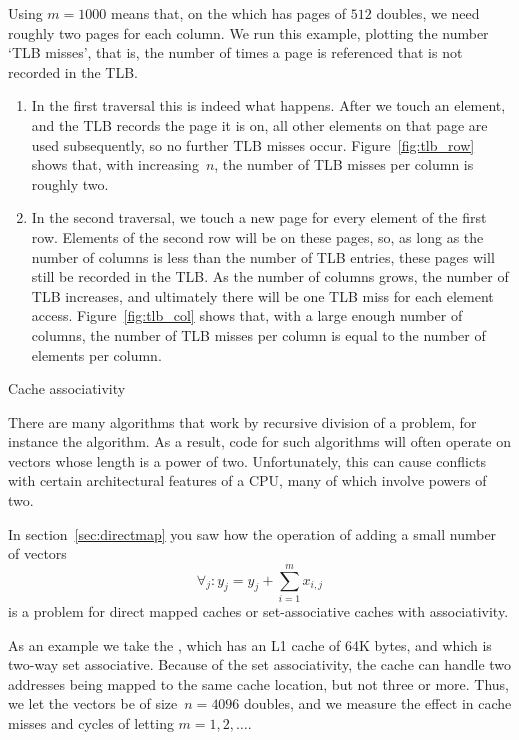 Using $m=1000$ means that, on the  which
has pages of $512$ doubles, we need roughly two pages for each
column. We run this example, plotting the number `TLB misses', that
is, the number of times a page is referenced that is not recorded in
the TLB.
\begin{enumerate}
\item In the first traversal this is indeed what happens. After we
  touch an element, and the TLB records the page it is on, all other
  elements on that page are used subsequently, so no further TLB
  misses occur. Figure~\ref{fig:tlb_row} shows that, with increasing~$n$,
  the number of TLB misses per column is roughly two.
\item In the second traversal, we touch a new page for every element
  of the first row. Elements of the second row will be on these pages,
  so, as long as the number of columns is less than the number of TLB
  entries, these pages will still be recorded in the TLB. As the
  number of columns grows, the number of TLB increases, and ultimately
  there will be one TLB miss for each element
  access. Figure~\ref{fig:tlb_col} shows that, with a large enough number
  of columns, the number of TLB misses per column is equal to the
  number of elements per column.
\end{enumerate}

 {Cache associativity}
\label{sec:assoc-coding}

There are many algorithms that work by recursive division of a
problem, for instance the  algorithm. As a result, code
for such algorithms will often operate on vectors whose length is a power of
two. Unfortunately, this can cause conflicts with certain
architectural features of a CPU, many of which involve powers of two.

In section~\ref{sec:directmap} you saw how
the operation of adding a small number of vectors
\[ \forall_j\colon y_j= y_j+\sum_{i=1}^mx_{i,j} \]
is a problem for direct mapped caches or set-associative caches with
associativity.

As an example we take the
, which has an L1 cache of 64K bytes, and
which is two-way set associative. Because of the set associativity,
the cache can handle two addresses being mapped to the same cache
location, but not three or more. Thus, we let the vectors be of
size~$n=4096$ doubles, and we measure the effect in cache misses and
cycles of letting $m=1,2,\ldots$.

